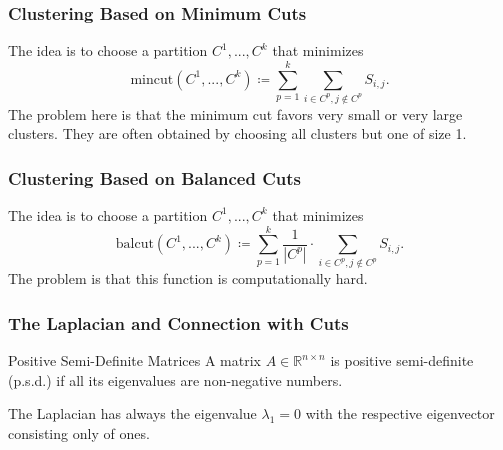\documentclass[english]{panikzettel}
\begin{document}
\subsubsection{Clustering Based on Minimum Cuts}
The idea is to choose a partition $C^1,..., C^k$ that minimizes
\[
\text{mincut}(C^1,...,C^k)\coloneqq \sum_{p=1}^k \sum_{i\in C^p, j\notin C^p} S_{i,j}.
\]
The problem here is that the minimum cut favors very small or very large clusters. They are often obtained by choosing all clusters but one of size 1.

\subsubsection{Clustering Based on Balanced Cuts}
The idea is to choose a partition $C^1,..., C^k$ that minimizes
\[
\text{balcut}(C^1,..., C^k)\coloneqq \sum_{p=1}^k \frac{1}{|C^p|}\cdot \sum_{i\in C^p, j\notin C^p} S_{i,j}.
\]
The problem is that this function is computationally hard.

\subsubsection{The Laplacian and Connection with Cuts}

\begin{halfboxl}
\vspace{-\baselineskip}
	\begin{defi}{Positive Semi-Definite Matrices}
	A matrix $A\in\mathbb{R}^{n\times n}$ is positive semi-definite (p.s.d.) if all its eigenvalues are non-negative numbers.
	\end{defi}
\end{halfboxl}
\begin{halfboxr}
\vspace{-\baselineskip}
	The Laplacian has always the eigenvalue $\lambda_1=0$ with the respective eigenvector consisting only of ones.
\end{halfboxr}
\end{document}

